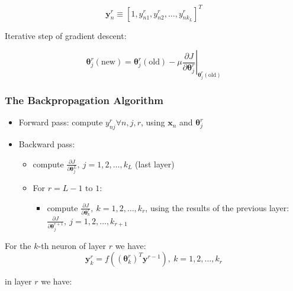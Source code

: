 \documentclass{article}
\begin{document}
\begin{multicols}{2}
\[\symbf{y}_n^r \equiv [1, y_{n 1}^r, y_{n 2}^r, \ldots, y_{n k_L}^r]^T\]

Iterative step of gradient descent:

\[\symbf{\theta}_j^r(\text{new}) = \symbf{\theta}_j^r(\text{old}) - \mu \left.\frac{\partial J}{\partial \symbf{\theta}_j^r} \right|_{\symbf{\theta}_j^r(\text{old})}\]

\subsubsection*{The Backpropagation Algorithm}

\begin{mdframed}
\begin{itemize}
	\item Forward pass: compute $y_{nj}^r \forall n, j, r$, using $\symbf{x}_n$ and $\symbf{\theta}_j^r$ 
	\item Backward pass:
	\begin{itemize}
		\item compute $\frac{\partial J}{\partial \symbf{\theta}_j^L},\ j=1, 2, \ldots, k_L$ (last layer)
		\item For $r = L-1 \text{ to } 1$:
		\begin{itemize}
			\item compute $\frac{\partial J}{\partial \symbf{\theta}_k^r},\ k=1, 2, \ldots, k_r$, using the results of the previous layer: $\frac{\partial J}{\partial \symbf{\theta}_j^{r+1}},\ j=1, 2, \ldots, k_{r+1}$
		\end{itemize}
	\end{itemize}
\end{itemize}
\end{mdframed}

For the $k$-th neuron of layer $r$ we have:
\[\symbf{y}_k^r = f\left((\symbf{\theta}_k^r)^T \symbf{y}^{r-1}\right),\ k=1, 2, \ldots, k_r\]

in layer $r$ we have:
\begin{figure}[H]
\end{figure}
\end{multicols}
\end{document}
